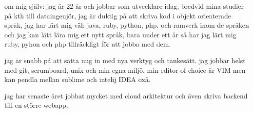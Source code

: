 \documentclass{article}
\begin{document}
om mig själv:
jag är 22 år och jobbar som utvecklare idag, bredvid mina studier på kth till dataingenjör, jag är duktig på att skriva kod i objekt orienterade språk, jag har lärt mig väl: java, ruby, python, php. och ramverk inom de språken och jag kan lätt lära mig ett nytt språk, bara under ett år så har jag lärt mig ruby, pyhon och php tillräckligt för att jobba med dem.

jag är snabb på att sätta mig in med nya verktyg och tankesätt. jag jobbar helst med git, scrumboard, unix och min egna miljö. min editor of choice är VIM men kan pendla mellan sublime och intelij IDEA oxå.

jag har senaste året jobbat mycket med cloud arkitektur och även skriva backend till en större webapp,
\end{document}
